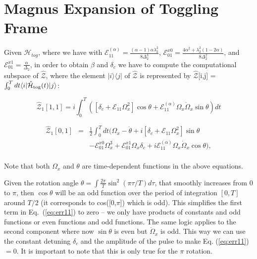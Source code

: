 \documentclass[superscriptaddress,amsmath,amssymb,aps,twocolumn,praplied,notitlepage]{revtex4-2}
\begin{document}
\section{Magnus Expansion of Toggling Frame}
\label{Magnus_App}

Given $\mathcal{H}_{tog}$, where we have with $\mathcal{E}_{11}^{(\alpha)}=\frac{(\alpha-1)\alpha\lambda_2^2}{8\Delta_2^3}$, $\mathcal{E}^{x0}_{01}=\frac{4\alpha^2+\lambda_2^2(1-2\alpha)}{8\Delta_2^2}$, and  $\mathcal{E}^{x1}_{01}=\frac{\alpha}{\Delta_2}$,{ in order} to obtain $\beta$ and $\delta_c$ we have to compute the computational subspace of $\mathcal{\hat{Z}}$, {where the element $|i\rangle\langle j|$ of $\mathcal{\hat{Z}}$ is represented by $\mathcal{\hat{Z}}$[i,j] = $\int_{0}^{T}dt \langle i|\hat{\mathcal{H}}_{\rm{tog}}(t)|j \rangle$}:

\begin{equation}
   \hat{\mathcal{Z}}_{1}[1,1]  = i\int_0^T \left(\left[\delta_c+\mathcal{E}_{11}\Omega_x^2\right]\cos{\theta}+\mathcal{E}_{11}^{(\alpha)}\Omega_x\dot{\Omega}_x\sin{\theta}\right)dt
    \label{eq:err11}
\end{equation}

\begin{eqnarray}
    \hat{\mathcal{Z}}_{1}[0,1] &=& \frac{1}{2}\int_0^T dt\bigg(\Omega_x-\dot\theta+i\left[\delta_c+\mathcal{E}_{11}\Omega_x^2\right]\sin{\theta} \nonumber\\ &&- \mathcal{E}^{x0}_{01}\Omega_x^3+\mathcal{E}^{x1}_{01}\Omega_x\delta_c+i\mathcal{E}_{11}^{(\alpha)}\Omega_x\dot{\Omega}_x\cos{\theta}\bigg),\nonumber \\
    \label{eq:err01}
\end{eqnarray}

 Note that both $\Omega_x$ and $\theta$ are time-dependent functions in the above equations.

Given the rotation angle $\theta=\int \frac{2\pi}{T}\sin^2({\pi \tau/T})d\tau$, that smoothly increases from 0 to $\pi$, then $\cos{\theta}$ will be an odd function over the period of integration $[0,T]$ around $T/2$ (it corresponds to cos([0,$\pi$]) which is odd). This simplifies the first term in Eq.~(\ref{eq:err11}) to zero -- we only have products of constants and odd functions or even functions and odd functions. The same logic applies to the second component where now $\sin{\theta}$ is even but $\dot{\Omega}_x$
is odd. This way we can use the constant detuning $\delta_c$ and the amplitude of the pulse to make Eq. (\ref{eq:err11}) $=0$. It is important to note that this is only true for the $\pi$ rotation.
\end{document}
